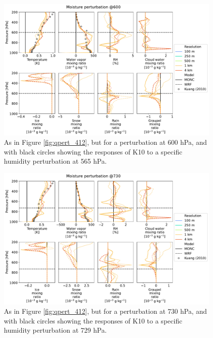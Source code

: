 \documentclass[draft]{agujournal2019}
\begin{document}
\begin{figure}[pth]
    \noindent\includegraphics[width=\textwidth]{figures/pert_diffs_q_0.0002_@600}
    \caption{As in Figure \ref{fig:qpert_412}, but for a perturbation at 600
    hPa, and with black circles showing the responses of K10 to a specific
    humidity perturbation at 565 hPa.}
    \label{fig:qpert_600}
\end{figure}

\begin{figure}[pth]
    \noindent\includegraphics[width=\textwidth]{figures/pert_diffs_q_0.0002_@730}
    \caption{As in Figure \ref{fig:qpert_412}, but for a perturbation at 730
    hPa, and with black circles showing the responses of K10 to a specific
    humidity perturbation at 729 hPa.}
    \label{fig:qpert_730}
\end{figure}
\end{document}
